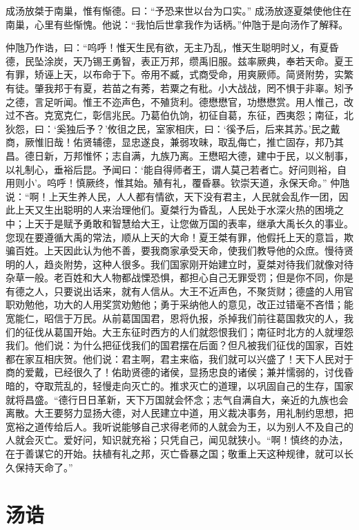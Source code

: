 \documentclass[a4paper,12pt,UTF8,twoside]{ctexbook}
\begin{document}
成汤放桀于南巢，惟有惭德。曰：“予恐来世以台为口实。”
成汤放逐夏桀使他住在南巢，心里有些惭愧。他说：“我怕后世拿我作为话柄。”仲虺于是向汤作了解释。

仲虺乃作诰，曰：“呜呼！惟天生民有欲，无主乃乱，惟天生聪明时乂，有夏昏德，民坠涂炭，天乃锡王勇智，表正万邦，缵禹旧服。兹率厥典，奉若天命。夏王有罪，矫诬上天，以布命于下。帝用不臧，式商受命，用爽厥师。简贤附势，实繁有徒。肇我邦于有夏，若苗之有莠，若粟之有秕。小大战战，罔不惧于非辜。矧予之德，言足听闻。惟王不迩声色，不殖货利。德懋懋官，功懋懋赏。用人惟己，改过不吝。克宽克仁，彰信兆民。乃葛伯仇饷，初征自葛，东征，西夷怨；南征，北狄怨，曰：‘奚独后予？’攸徂之民，室家相庆，曰：‘徯予后，后来其苏。’民之戴商，厥惟旧哉！佑贤辅德，显忠遂良，兼弱攻昧，取乱侮亡，推亡固存，邦乃其昌。德日新，万邦惟怀；志自满，九族乃离。王懋昭大德，建中于民，以义制事，以礼制心，垂裕后昆。予闻曰：‘能自得师者王，谓人莫己若者亡。好问则裕，自用则小’。呜呼！慎厥终，惟其始。殖有礼，覆昏暴。钦崇天道，永保天命。”
仲虺说：“啊！上天生养人民，人人都有情欲，天下没有君主，人民就会乱作一团，因此上天又生出聪明的人来治理他们。夏桀行为昏乱，人民处于水深火热的困境之中；上天于是赋予勇敢和智慧给大王，让您做万国的表率，继承大禹长久的事业。您现在要遵循大禹的常法，顺从上天的大命！夏王桀有罪，他假托上天的意旨，欺骗百姓。上天因此认为他不善，要我商家承受天命，使我们教导他的众庶。慢待贤明的人，趋炎附势，这种人很多。我们国家刚开始建立时，夏桀对待我们就像对待杂草一般。老百姓和大人物都战慄恐惧，都担心自己无罪受罚；但是你不同，你是有德之人，只要说出话来，就有人信从。大王不近声色，不聚货财；德盛的人用官职劝勉他，功大的人用奖赏劝勉他；勇于采纳他人的意见，改正过错毫不吝惜；能宽能仁，昭信于万民。从前葛国国君，恩将仇报，杀掉我们前往葛国救灾的人，我们的征伐从葛国开始。大王东征时西方的人们就怨恨我们；南征时北方的人就埋怨我们。他们说：为什么把征伐我们的国君摆在后面？但凡被我们征伐的国家，百姓都在家互相庆贺。他们说：君主啊，君主来临，我们就可以兴盛了！天下人民对于商的爱戴，已经很久了！佑助贤德的诸侯，显扬忠良的诸侯；兼并懦弱的，讨伐昏暗的，夺取荒乱的，轻慢走向灭亡的。推求灭亡的道理，以巩固自己的生存，国家就将昌盛。“德行日日革新，天下万国就会怀念；志气自满自大，亲近的九族也会离散。大王要努力显扬大德，对人民建立中道，用义裁决事务，用礼制约思想，把宽裕之道传给后人。我听说能够自己求得老师的人就会为王，以为别人不及自己的人就会灭亡。爱好问，知识就充裕；只凭自己，闻见就狭小。“啊！慎终的办法，在于善谋它的开始。扶植有礼之邦，灭亡昏暴之国；敬重上天这种规律，就可以长久保持天命了。”

\chapter{汤诰}
\end{document}
